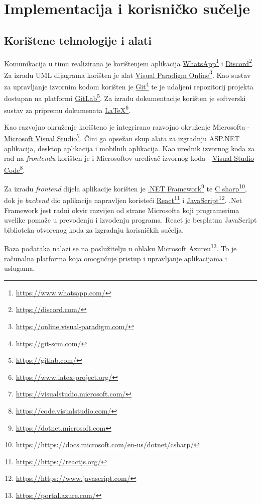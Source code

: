 \chapter{Implementacija i korisničko sučelje}
		
		
		\section{Korištene tehnologije i alati}
			 
			 \par
			 Komunikacija u timu realizirana je korištenjem aplikacija \underline{WhatsApp}\footnote{\url{https://www.whatsapp.com/}} i \underline{Discord}\footnote{\url{https://discord.com/}}. Za izradu UML dijagrama korišten je alat \underline{Visual Paradigm Online}\footnote{\url{https://online.visual-paradigm.com/}}. Kao sustav za upravljanje izvornim kodom korišten je \underline{Git}\footnote{\url{https://git-scm.com/}} te je udaljeni repozitorij projekta dostupan na platformi \underline{GitLab}\footnote{\url{https://gitlab.com/}}. Za izradu dokumentacije korišten je softverski sustav za pripremu dokumenata \underline{LaTeX}\footnote{\url{https://www.latex-project.org/}}.
			 \par
			 Kao razvojno okruženje korišteno je integrirano razvojno okruženje Microsofta - \underline{Microsoft Visual Studio}\footnote{\url{https://visualstudio.microsoft.com/}}. Čini ga opsežan skup alata za izgradnju ASP.NET aplikacija, desktop aplikacija i mobilnih aplikacija. Kao urednik izvornog koda za rad na \textit{frontendu} korišten je i Microsoftov uređivač izvornog koda - \underline{Visual Studio Code}\footnote{\url{https://code.visualstudio.com/}}.
			 \par
			 Za izradu \textit{frontend} dijela aplikacije korišten je \underline{.NET Framework}\footnote{\url{https://dotnet.microsoft.com}} te \underline{C sharp}\footnote{\url{https://https://docs.microsoft.com/en-us/dotnet/csharp/}}, dok je \textit{backend} dio aplikacije napravljen koristeći \underline{React}\footnote{\url{https://https://reactjs.org/}} i \underline{JavaScript}\footnote{\url{https://https://www.javascript.com/}}. .Net Framework jest radni okvir razvijen od strane Microsofta koji programerima uvelike pomaže u prevođenju i izvođenju programa. React je besplatna JavaScript biblioteka otvorenog koda za izgradnju korisničkih sučelja.
			 \par
			 Baza podataka nalazi se na poslužitelju u oblaku \underline{Microsoft Azureu}\footnote{\url{https://portal.azure.com/}}. To je računalna platforma koja omogućuje pristup i upravljanje aplikacijama i uslugama. 
			
